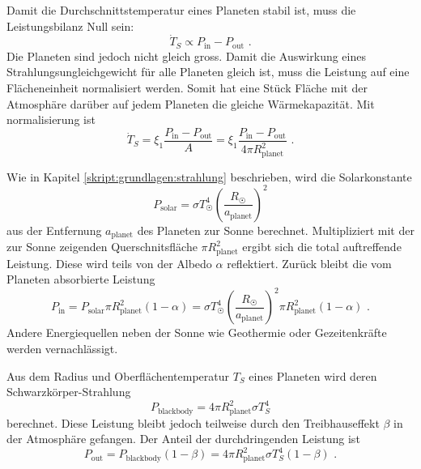 \begin{refsection}
Damit die Durchschnittstemperatur eines Planeten stabil ist, muss die Leistungsbilanz Null sein:
\begin{equation}
\dot{T}_S \propto P_{\text{in}} - P_{\text{out}}\text{ .}
\end{equation}
Die Planeten sind jedoch nicht gleich gross. Damit die Auswirkung eines Strahlungsungleichgewicht für alle Planeten gleich ist, muss die Leistung auf eine Flächeneinheit normalisiert werden. Somit hat eine Stück Fläche mit der Atmosphäre darüber auf jedem Planeten die gleiche Wärmekapazität. Mit normalisierung ist
\begin{equation}
\dot{T}_S = \xi_1 \frac{P_{\text{in}} - P_{\text{out}}}{A} = \xi_1 \frac{P_{\text{in}} - P_{\text{out}}}{4 \pi R_{\text{planet}}^2}\text{ .}
\end{equation}

Wie in Kapitel \ref{skript:grundlagen:strahlung} beschrieben, wird die Solarkonstante
\begin{equation}
P_{\text{solar}} = \sigma T_{\astrosun}^4 \left( \frac{R_{\astrosun}}{a_{\text{planet}}} \right) ^2
\end{equation}
aus der Entfernung $a_{\text{planet}}$ des Planeten zur Sonne berechnet. Multipliziert mit der zur Sonne zeigenden Querschnitsfläche $\pi R_{\text{planet}}^2$ ergibt sich die total auftreffende Leistung. Diese wird teils von der Albedo $\alpha$ reflektiert. Zurück bleibt die vom Planeten absorbierte Leistung \begin{equation}
P_{\text{in}} = P_{\text{solar}}  \pi R_{\text{planet}}^2 (1-\alpha) = \sigma T_{\astrosun}^4 \left( \frac{R_{\astrosun}}{a_{\text{planet}}} \right) ^2 \pi R_{\text{planet}}^2 (1-\alpha)\text{ .}
\end{equation}
Andere Energiequellen neben der Sonne wie Geothermie oder Gezeitenkräfte werden vernachlässigt.

Aus dem Radius und Oberflächentemperatur $T_{S}$ eines Planeten wird deren Schwarzkörper-Strahlung \begin{equation}
P_{\text{blackbody}} = 4 \pi R_{\text{planet}}^2 \sigma T_{S}^4
\end{equation}
berechnet. Diese Leistung bleibt jedoch teilweise durch den Treibhauseffekt $\beta$ in der Atmosphäre gefangen. Der Anteil der durchdringenden Leistung ist
\begin{equation}
P_{\text{out}} = P_{\text{blackbody}} (1 - \beta) = 4 \pi R_{\text{planet}}^2 \sigma T_{S}^4 (1 - \beta)\text{ .}
\end{equation}


\end{refsection}
